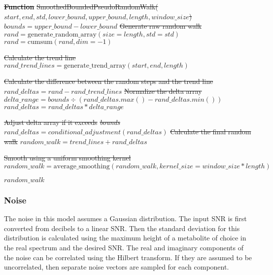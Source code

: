 \documentclass[AMA,LATO1COL]{WileyNJD-v2}
\providecommand{\DIFdel}[1]{{\protect\color{red}\sout{#1}}}                      %
\providecommand{\DIFdelend}{} %
\begin{document}
\textbf{\DIFdel{Function}} %
\DIFdel{SmoothedBoundedPseudoRandomWalk($start, end, std, lower\_bound, upper\_bound, length, window\_size$)
}%
\DIFdel{$bounds = upper\_bound - lower\_bound$
}%
\DIFdel{Generate raw random walk
}%
\DIFdel{$rand = \text{generate\_random\_array}(size=length, std=std)$
}%
\DIFdel{$rand = \text{cumsum}(rand, dim=-1)$
}%

\DIFdel{Calculate the trend line
}%
\DIFdel{$rand\_trend\_lines = \text{generate\_trend\_array}(start, end, length)$
}%

\DIFdel{Calculate the difference between the random steps and the trend line
}%
\DIFdel{$rand\_deltas = rand - rand\_trend\_lines$
}%
\DIFdel{Normalize the delta array
}%
\DIFdel{$delta\_range = bounds \div (rand\_deltas.max() - rand\_deltas.min())$
}%
\DIFdel{$rand\_deltas = rand\_deltas * delta\_range$
}%

\DIFdel{Adjust delta array if it exceeds }\textit{\DIFdel{bounds}}
\DIFdel{$rand\_deltas = conditional\_adjustment(rand\_deltas)$
}%
\DIFdel{Calculate the final random walk
}%
\DIFdel{$random\_walk = trend\_lines + rand\_deltas$
}%

\DIFdel{Smooth using a uniform smoothing kernel
}%
\DIFdel{$random\_walk = \text{average\_smoothing}(random\_walk, kernel\_size=window\_size * length)$
}%

\DIFdel{$random\_walk$ %
}%
\DIFdelend %

\subsubsection{Noise}
The noise in this model assumes a Gaussian distribution. The input SNR is first converted from decibels to a linear SNR. Then the standard deviation for this distribution is calculated using the maximum height of a metabolite of choice in the real spectrum and the desired SNR. The real and imaginary components of the noise can be correlated using the Hilbert transform. If they are assumed to be uncorrelated, then separate noise vectors are sampled for each component. 
\end{document}
